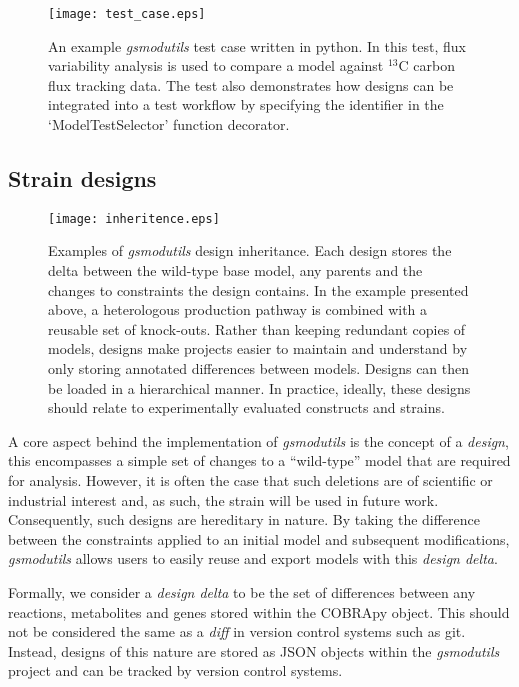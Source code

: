 \documentclass[journal=asbcd6]{achemso}
\begin{document}
\begin{figure}[ht]
\texttt{[image: test\_case.eps]}
\caption{An example \textit{gsmodutils} test case written in python. 
In this test, flux variability analysis is used to compare a model against $^{13}$C carbon flux tracking data.
The test also demonstrates how designs can be integrated into a test workflow by specifying the identifier in the `ModelTestSelector' function decorator.
}
\label{fig:test_case} 
\end{figure}

\subsection{Strain designs}

\begin{figure*}[ht]
  \texttt{[image: inheritence.eps]}
  \caption{Examples of \textit{gsmodutils} design inheritance.
  Each design stores the delta between the wild-type base model, any parents and the changes to constraints the design contains.
  In the example presented above, a heterologous production pathway is combined with a reusable set of knock-outs.
  Rather than keeping redundant copies of models, designs make projects easier to maintain and understand by only storing annotated differences between models.
  Designs can then be loaded in a hierarchical manner.
  In practice, ideally, these designs should relate to experimentally evaluated constructs and strains.
  }
    \label{fig:strain_hered}
\end{figure*}

A core aspect behind the implementation of \textit{gsmodutils} is the concept of a \textit{design}, this encompasses a simple set of changes to a ``wild-type'' model that are required for analysis.
However, it is often the case that such deletions are of scientific or industrial interest and, as such, the strain will be used in future work.
Consequently, such designs are hereditary in nature.
By taking the difference between the constraints applied to an initial model and subsequent modifications, \textit{gsmodutils} allows users to easily reuse and export models with this \textit{design delta}.

Formally, we consider a \textit{design delta} to be the set of differences between any reactions, metabolites and genes stored within the COBRApy object.
This should not be considered the same as a \textit{diff} in version control systems such as git. 
Instead, designs of this nature are stored as JSON objects within the \textit{gsmodutils} project and can be tracked by version control systems.
\end{document}
